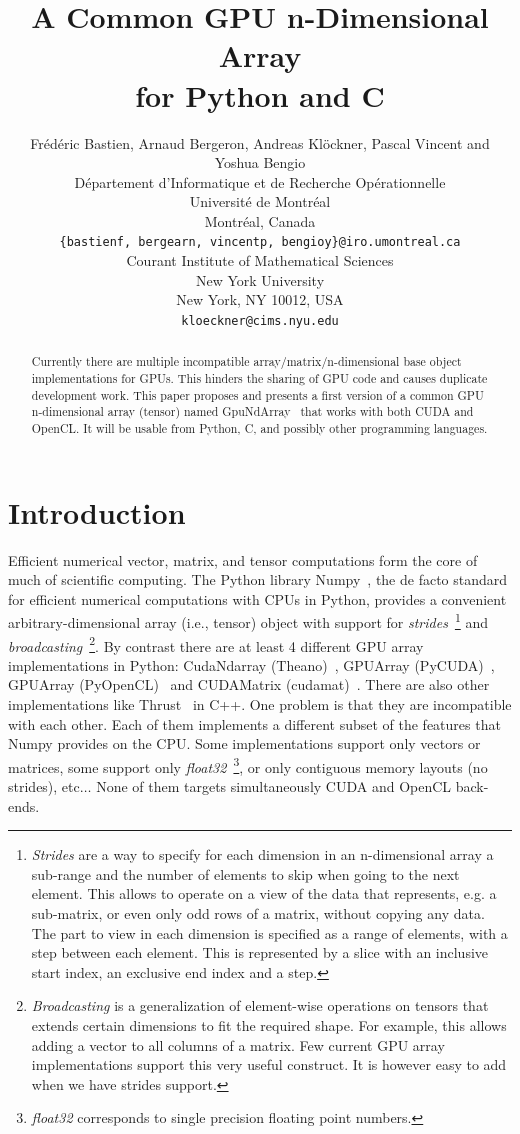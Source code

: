 \documentclass{article} %
\title{A Common GPU n-Dimensional Array \\
 for Python and C}
\author{
Frédéric Bastien\superscript{a}, Arnaud Bergeron\superscript{a}, Andreas Klöckner\superscript{b}, Pascal Vincent\superscript{a} and Yoshua Bengio\superscript{a} \\
\superscript{a}D\'epartement d'Informatique et de Recherche Op\'erationnelle\\
Universit\'e de Montr\'eal\\
Montr\'eal, Canada \\
\texttt{\{bastienf, bergearn, vincentp, bengioy\}@iro.umontreal.ca} \\
\superscript{b}Courant Institute of Mathematical Sciences \\
New York University\\
New York, NY 10012, USA\\
\texttt{kloeckner@cims.nyu.edu} \\
}
\begin{document}
\maketitle

\begin{abstract}
Currently there are multiple incompatible array/matrix/n-dimensional base object implementations for GPUs. 
This hinders the sharing of GPU code and causes duplicate development work.
This paper proposes and presents a first version of a common GPU n-dimensional array (tensor) named GpuNdArray~\citep{GpuNdArray} that works with both CUDA and OpenCL.
It will be usable from Python, C, and possibly other programming languages.
\end{abstract}

\section{Introduction}
Efficient numerical vector, matrix, and tensor computations form the core of much of scientific computing.
The Python library Numpy~\citep{numpy-2007}, the de facto standard for efficient numerical computations with CPUs in Python, provides a convenient 
arbitrary-dimensional array (i.e., tensor) object with support for \emph{strides}~\footnote{
\emph{Strides} are a way to specify for each dimension in an n-dimensional array a sub-range and the number of elements to skip when going
to the next element. 
This allows to operate on a view of the data that represents, e.g. a sub-matrix, or even only odd rows of a matrix, without copying any data.
The part to view in each dimension is specified as a range of elements, with a step between each element.
This is represented by a slice with an inclusive start index, an exclusive end index and a step.
}
and \emph{broadcasting}~\footnote{
\emph{Broadcasting} is a generalization of element-wise operations on tensors that extends certain dimensions to fit the required shape.
For example, this allows adding a vector to all columns of a matrix.
Few current GPU array implementations support this very useful construct.
It is however easy to add when we have strides support.
}.
By contrast there are at least 4 different GPU array implementations in
Python: CudaNdarray (Theano)~\citep{bergstra+al:2010-scipy},
GPUArray (PyCUDA)~\citep{kloeckner_pycuda_2009},
GPUArray (PyOpenCL)~\citep{kloeckner_pycuda_2009} and
CUDAMatrix (cudamat)~\citep{cudamat-TR2009}.
There are also other implementations like Thrust~\citep{Thrust} in C++.
One problem is that they are incompatible with each other.
Each of them implements a different subset of the features that Numpy provides on the CPU.
Some implementations support only vectors or matrices, some support only \emph{float32}~\footnote{
\emph{float32} corresponds to single precision floating point numbers.
}, or only contiguous memory layouts (no strides), etc$\ldots$
None of them targets simultaneously CUDA and OpenCL back-ends.
\end{document}

